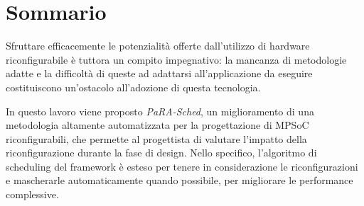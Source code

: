 \chapter*{Sommario}
\vspace{0.5cm}
Sfruttare efficacemente le potenzialit\`a offerte dall'utilizzo di hardware riconfigurabile
\`e tuttora un compito impegnativo: la mancanza di metodologie adatte e
la difficolt\`a di queste ad adattarsi all'applicazione da eseguire costituiscono
un'ostacolo all'adozione di questa tecnologia.

In questo lavoro viene proposto \emph{PaRA-Sched}, un miglioramento di una metodologia
altamente automatizzata per la progettazione di \acs{MPSoC} riconfigurabili, che permette
al progettista di valutare l'impatto della riconfigurazione durante la fase di design.
Nello specifico, l'algoritmo di scheduling del framework \`e esteso per tenere in considerazione
le riconfigurazioni e mascherarle automaticamente quando possibile, per migliorare le
performance complessive.

